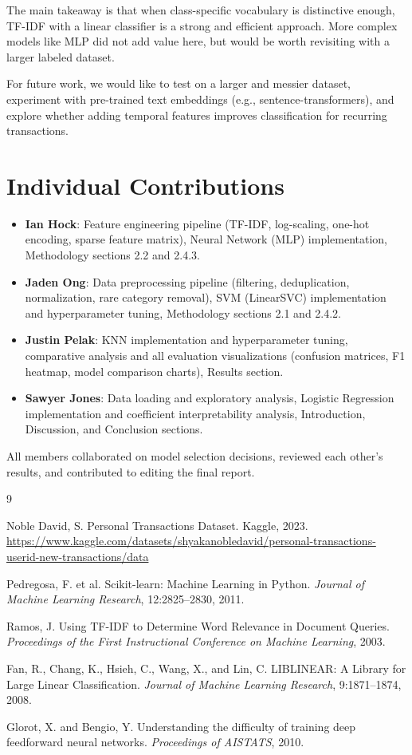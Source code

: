 \documentclass[11pt]{article}
\begin{document}
The main takeaway is that when class-specific vocabulary is distinctive enough, TF-IDF with a linear classifier is a strong and efficient approach. More complex models like MLP did not add value here, but would be worth revisiting with a larger labeled dataset.

For future work, we would like to test on a larger and messier dataset, experiment with pre-trained text embeddings (e.g., sentence-transformers), and explore whether adding temporal features improves classification for recurring transactions.

\section{Individual Contributions}

\begin{itemize}
  \item \textbf{Ian Hock}: Feature engineering pipeline (TF-IDF, log-scaling, one-hot encoding, sparse feature matrix), Neural Network (MLP) implementation, Methodology sections 2.2 and 2.4.3.
  \item \textbf{Jaden Ong}: Data preprocessing pipeline (filtering, deduplication, normalization, rare category removal), SVM (LinearSVC) implementation and hyperparameter tuning, Methodology sections 2.1 and 2.4.2.
  \item \textbf{Justin Pelak}: KNN implementation and hyperparameter tuning, comparative analysis and all evaluation visualizations (confusion matrices, F1 heatmap, model comparison charts), Results section.
  \item \textbf{Sawyer Jones}: Data loading and exploratory analysis, Logistic Regression implementation and coefficient interpretability analysis, Introduction, Discussion, and Conclusion sections.
\end{itemize}

All members collaborated on model selection decisions, reviewed each other's results, and contributed to editing the final report.

\begin{thebibliography}{9}

Noble David, S. Personal Transactions Dataset.
Kaggle, 2023.
\url{https://www.kaggle.com/datasets/shyakanobledavid/personal-transactions-userid-new-transactions/data}

Pedregosa, F. et al.
Scikit-learn: Machine Learning in Python.
\textit{Journal of Machine Learning Research}, 12:2825--2830, 2011.

Ramos, J.
Using TF-IDF to Determine Word Relevance in Document Queries.
\textit{Proceedings of the First Instructional Conference on Machine Learning}, 2003.

Fan, R., Chang, K., Hsieh, C., Wang, X., and Lin, C.
LIBLINEAR: A Library for Large Linear Classification.
\textit{Journal of Machine Learning Research}, 9:1871--1874, 2008.

Glorot, X. and Bengio, Y.
Understanding the difficulty of training deep feedforward neural networks.
\textit{Proceedings of AISTATS}, 2010.

\end{thebibliography}
\end{document}
